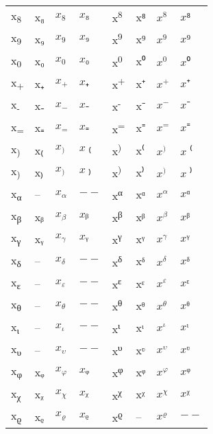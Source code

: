 \documentclass{standalone}
\begin{document}
\begin{tabular}{ll|ll|ll|ll}
x\textsubscript{8} & x₈ & $x_{8}$ & $x₈$ & x\textsuperscript{8} & x⁸ & $x^{8}$ & $x⁸$ \\
x\textsubscript{9} & x₉ & $x_{9}$ & $x₉$ & x\textsuperscript{9} & x⁹ & $x^{9}$ & $x⁹$ \\
x\textsubscript{0} & x₀ & $x_{0}$ & $x₀$ & x\textsuperscript{0} & x⁰ & $x^{0}$ & $x⁰$ \\
\midrule
x\textsubscript{+} & x₊ & $x_{+}$ & $x₊$ & x\textsuperscript{+} & x⁺ & $x^{+}$ & $x⁺$ \\
x\textsubscript{-} & x₋ & $x_{-}$ & $x₋$ & x\textsuperscript{-} & x⁻ & $x^{-}$ & $x⁻$ \\
x\textsubscript{=} & x₌ & $x_{=}$ & $x₌$ & x\textsuperscript{=} & x⁼ & $x^{=}$ & $x⁼$ \\
x\textsubscript{)} & x₍ & $x_{)}$ & $x₍$ & x\textsuperscript{)} & x⁽ & $x^{)}$ & $x⁽$ \\
x\textsubscript{)} & x₎ & $x_{)}$ & $x₎$ & x\textsuperscript{)} & x⁾ & $x^{)}$ & $x⁾$ \\
\midrule
x\textsubscript{α} & -- & $x_{α}$ & $--$ & x\textsuperscript{α} & xᵅ & $x^{α}$ & $xᵅ$ \\
x\textsubscript{β} & xᵦ & $x_{β}$ & $xᵦ$ & x\textsuperscript{β} & xᵝ & $x^{β}$ & $xᵝ$ \\
x\textsubscript{γ} & xᵧ & $x_{γ}$ & $xᵧ$ & x\textsuperscript{γ} & xᵞ & $x^{γ}$ & $xᵞ$ \\
x\textsubscript{δ} & -- & $x_{δ}$ & $--$ & x\textsuperscript{δ} & xᵟ & $x^{δ}$ & $xᵟ$ \\
x\textsubscript{ε} & -- & $x_{ε}$ & $--$ & x\textsuperscript{ε} & xᵋ & $x^{ε}$ & $xᵋ$ \\
x\textsubscript{θ} & -- & $x_{θ}$ & $--$ & x\textsuperscript{θ} & xᶿ & $x^{θ}$ & $xᶿ$ \\
x\textsubscript{ι} & -- & $x_{ι}$ & $--$ & x\textsuperscript{ι} & xᶥ & $x^{ι}$ & $xᶥ$ \\
x\textsubscript{υ} & -- & $x_{υ}$ & $--$ & x\textsuperscript{υ} & xᶹ & $x^{υ}$ & $xᶹ$ \\
x\textsubscript{φ} & xᵩ & $x_{φ}$ & $xᵩ$ & x\textsuperscript{φ} & xᵠ & $x^{φ}$ & $xᵠ$ \\
x\textsubscript{χ} & xᵪ & $x_{χ}$ & $xᵪ$ & x\textsuperscript{χ} & xᵡ & $x^{χ}$ & $xᵡ$ \\
x\textsubscript{ϱ} & xᵨ & $x_{ϱ}$ & $xᵨ$ & x\textsuperscript{ϱ} & -- & $x^{ϱ}$ & $--$ \\
\bottomrule
\end{tabular}
\end{document}

